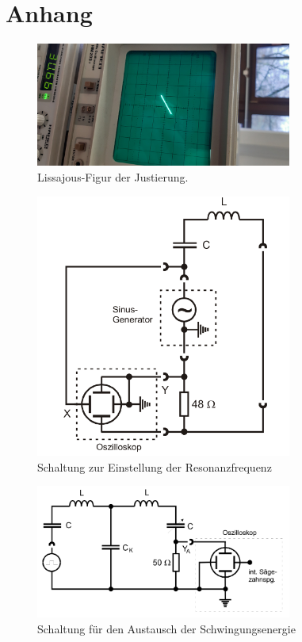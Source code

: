 \section{Anhang}
\label{sec:anhang}

\begin{figure}
    \centering
    \includegraphics[width=0.75\textwidth, angle=-90]{plots/Lissajour-Gerade.jpeg}
    \caption{Lissajous-Figur der Justierung.}
    \label{fig:Lissajous}
\end{figure}

\begin{figure}
    \centering
    \includegraphics[width=0.75\textwidth]{plots/Schaltung0.png}
    \caption{Schaltung zur Einstellung der Resonanzfrequenz \cite{Versuchsanleitung}}
    \label{fig:schaltung0}
\end{figure}

\begin{figure}
    \centering
    \includegraphics[width=0.75\textwidth]{plots/Schaltung1.png}
    \caption{Schaltung für den Austausch der Schwingungsenergie \cite{Versuchsanleitung}}
    \label{fig:schaltung1}
\end{figure}